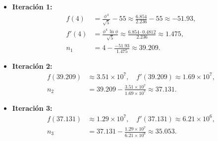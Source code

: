 \documentclass[12pt]{article}
\begin{document}
\begin{itemize}[left=0pt]
  \item \textbf{Iteración 1:}
    \[
    \begin{aligned}
      f(4)&=\tfrac{\phi^4}{\sqrt5}-55\approx\tfrac{6.854}{2.236}-55\approx-51.93,\\
      f'(4)&=\tfrac{\phi^4\,\ln\phi}{\sqrt5}\approx\tfrac{6.854\cdot0.4812}{2.236}\approx1.475,\\
      n_1&=4-\frac{-51.93}{1.475}\approx39.209.
    \end{aligned}
    \]
  \item \textbf{Iteración 2:}
    \[
    \begin{aligned}
      f(39.209)&\approx3.51\times10^7,\quad f'(39.209)\approx1.69\times10^7,\\
      n_2&=39.209-\frac{3.51\times10^7}{1.69\times10^7}\approx37.131.
    \end{aligned}
    \]
  \item \textbf{Iteración 3:}
    \[
    \begin{aligned}
      f(37.131)&\approx1.29\times10^7,\quad f'(37.131)\approx6.21\times10^6,\\
      n_3&=37.131-\frac{1.29\times10^7}{6.21\times10^6}\approx35.053.
    \end{aligned}
    \]
\end{itemize}
\end{document}
